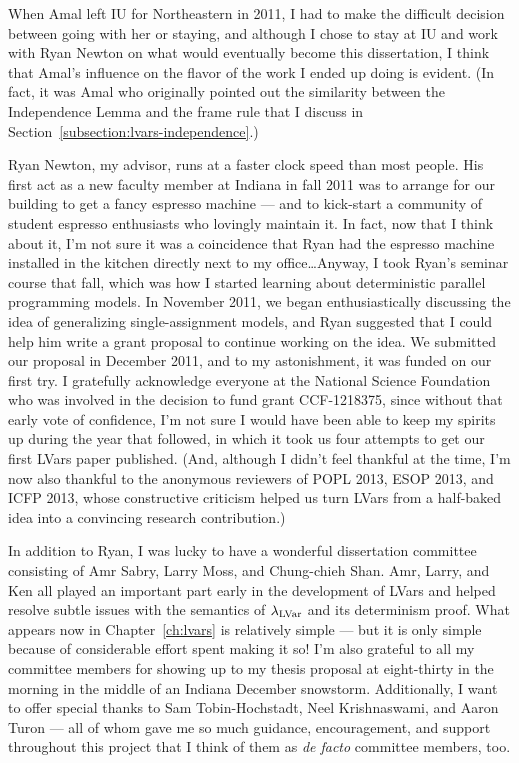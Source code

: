When Amal left IU for Northeastern in 2011, I had to make the difficult decision between going with her or staying, and although I chose to stay at IU and work with Ryan Newton on what would eventually become this dissertation, I think that Amal's influence on the flavor of the work I ended up doing is evident.  (In fact, it was Amal who originally pointed out the similarity between the Independence Lemma and the frame rule that I discuss in Section~\ref{subsection:lvars-independence}.)

Ryan Newton, my advisor, runs at a faster clock speed than most people.  His first act as a new faculty member at Indiana in fall 2011 was to arrange for our building to get a fancy espresso machine --- and to kick-start a community of student espresso enthusiasts who lovingly maintain it.  In fact, now that I think about it, I'm not sure it was a coincidence that Ryan had the espresso machine installed in the kitchen directly next to my office\dots  Anyway, I took Ryan's seminar course that fall, which was how I started learning about deterministic parallel programming models.  In November 2011, we began enthusiastically discussing the idea of generalizing single-assignment models, and Ryan suggested that I could help him write a grant proposal to continue working on the idea.  We submitted our proposal in December 2011, and to my astonishment, it was funded on our first try.  I gratefully acknowledge everyone at the National Science Foundation who was involved in the decision to fund grant CCF-1218375, since without that early vote of confidence, I'm not sure I would have been able to keep my spirits up during the year that followed, in which it took us four attempts to get our first LVars paper published.  (And, although I didn't feel thankful at the time, I'm now also thankful to the anonymous reviewers of POPL 2013, ESOP 2013, and ICFP 2013, whose constructive criticism helped us turn LVars from a half-baked idea into a convincing research contribution.)

In addition to Ryan, I was lucky to have a wonderful dissertation committee consisting of Amr Sabry, Larry Moss, and Chung-chieh Shan.  Amr, Larry, and Ken all played an important part early in the development of LVars and helped resolve subtle issues with the semantics of $\lambda_{\textrm{LVar}}$ and its determinism proof.  What appears now in Chapter~\ref{ch:lvars} is relatively simple --- but it is only simple because of considerable effort spent making it so!  I'm also grateful to all my committee members for showing up to my thesis proposal at eight-thirty in the morning in the middle of an Indiana December snowstorm.  Additionally, I want to offer special thanks to Sam Tobin-Hochstadt, Neel Krishnaswami, and Aaron Turon --- all of whom gave me so much guidance, encouragement, and support throughout this project that I think of them as \emph{de facto} committee members, too.


